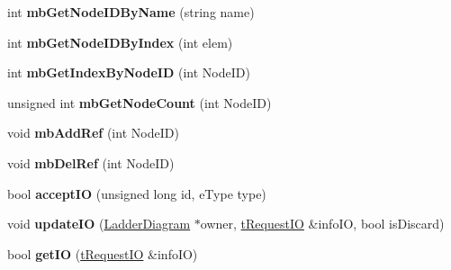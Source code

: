 \begin{DoxyCompactItemize}
\item 
\hypertarget{class_ladder_diagram_a1a255c793f1312a46df57d1c7fc4620c}{int {\bfseries mb\-Get\-Node\-I\-D\-By\-Name} (string name)}\label{class_ladder_diagram_a1a255c793f1312a46df57d1c7fc4620c}

\item 
\hypertarget{class_ladder_diagram_a6281d83c92376bbbde20738837200d1e}{int {\bfseries mb\-Get\-Node\-I\-D\-By\-Index} (int elem)}\label{class_ladder_diagram_a6281d83c92376bbbde20738837200d1e}

\item 
\hypertarget{class_ladder_diagram_a512e2a00d7fe19ada22505e7170cdc91}{int {\bfseries mb\-Get\-Index\-By\-Node\-I\-D} (int Node\-I\-D)}\label{class_ladder_diagram_a512e2a00d7fe19ada22505e7170cdc91}

\item 
\hypertarget{class_ladder_diagram_a0f3c828ef91171704d927cb607f34f87}{unsigned int {\bfseries mb\-Get\-Node\-Count} (int Node\-I\-D)}\label{class_ladder_diagram_a0f3c828ef91171704d927cb607f34f87}

\item 
\hypertarget{class_ladder_diagram_ae20f7e0aac1b298e0879199e23af7f69}{void {\bfseries mb\-Add\-Ref} (int Node\-I\-D)}\label{class_ladder_diagram_ae20f7e0aac1b298e0879199e23af7f69}

\item 
\hypertarget{class_ladder_diagram_a3156c7063aa854ffc8bdfbe9e65f14a0}{void {\bfseries mb\-Del\-Ref} (int Node\-I\-D)}\label{class_ladder_diagram_a3156c7063aa854ffc8bdfbe9e65f14a0}

\item 
\hypertarget{class_ladder_diagram_aff92f3cf28669af4820db5a7fc229735}{bool {\bfseries accept\-I\-O} (unsigned long id, e\-Type type)}\label{class_ladder_diagram_aff92f3cf28669af4820db5a7fc229735}

\item 
\hypertarget{class_ladder_diagram_aba67a6f158b4eeda14e4643aa0cf240b}{void {\bfseries update\-I\-O} (\hyperlink{class_ladder_diagram}{Ladder\-Diagram} $\ast$owner, \hyperlink{structt_request_i_o}{t\-Request\-I\-O} \&info\-I\-O, bool is\-Discard)}\label{class_ladder_diagram_aba67a6f158b4eeda14e4643aa0cf240b}

\item 
\hypertarget{class_ladder_diagram_a140ddaf284f4f74130cd5500cc942ed7}{bool {\bfseries get\-I\-O} (\hyperlink{structt_request_i_o}{t\-Request\-I\-O} \&info\-I\-O)}\label{class_ladder_diagram_a140ddaf284f4f74130cd5500cc942ed7}


\end{DoxyCompactItemize}
